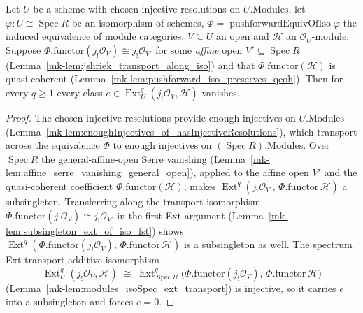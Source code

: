 \begin{lemma}\label{mk-lem:ext_jShriekOU_eq_zero_of_specIso}
  \leanok

  Let \(U\) be a scheme with chosen injective resolutions on \(U.\mathrm{Modules}\), let
  \(\varphi : U \cong \operatorname{Spec} R\) be an isomorphism of schemes,
  \(\Phi = \operatorname{pushforwardEquivOfIso}\varphi\) the induced equivalence of module categories,
  \(V \subseteq U\) an open and \(\mathcal{H}\) an \(\mathcal{O}_U\)-module. Suppose
  \(\Phi.\mathrm{functor}(j_!\mathcal{O}_V) \cong j_!\mathcal{O}_{V'}\) for some \emph{affine} open
  \(V' \subseteq \operatorname{Spec} R\) (Lemma~\ref{mk-lem:jshriek_transport_along_iso}) and that
  \(\Phi.\mathrm{functor}(\mathcal{H})\) is quasi-coherent
  (Lemma~\ref{mk-lem:pushforward_iso_preserves_qcoh}). Then for every \(q \geq 1\) every class
  \(e \in \operatorname{Ext}^q_U(j_!\mathcal{O}_V, \mathcal{H})\) vanishes.
\end{lemma}
\begin{proof}
  \leanok
    The chosen injective resolutions provide enough injectives on \(U.\mathrm{Modules}\)
  (Lemma~\ref{mk-lem:enoughInjectives_of_hasInjectiveResolutions}), which transport across the equivalence
  \(\Phi\) to enough injectives on \((\operatorname{Spec} R).\mathrm{Modules}\). Over
  \(\operatorname{Spec} R\) the general-affine-open Serre vanishing
  (Lemma~\ref{mk-lem:affine_serre_vanishing_general_open}), applied to the affine open \(V'\) and the
  quasi-coherent coefficient \(\Phi.\mathrm{functor}(\mathcal{H})\), makes
  \(\operatorname{Ext}^q(j_!\mathcal{O}_{V'},\, \Phi.\mathrm{functor}\,\mathcal{H})\) a subsingleton.
  Transferring along the transport isomorphism
  \(\Phi.\mathrm{functor}(j_!\mathcal{O}_V) \cong j_!\mathcal{O}_{V'}\) in the first Ext-argument
  (Lemma~\ref{mk-lem:subsingleton_ext_of_iso_fst}) shows
  \(\operatorname{Ext}^q(\Phi.\mathrm{functor}(j_!\mathcal{O}_V),\, \Phi.\mathrm{functor}\,\mathcal{H})\)
  is a subsingleton as well. The spectrum Ext-transport additive isomorphism
  \[
    \operatorname{Ext}^q_U(j_!\mathcal{O}_V, \mathcal{H})
      \;\cong\;
    \operatorname{Ext}^q_{\operatorname{Spec} R}\bigl(\Phi.\mathrm{functor}(j_!\mathcal{O}_V),\,
      \Phi.\mathrm{functor}\,\mathcal{H}\bigr)
  \]
  (Lemma~\ref{mk-lem:modules_isoSpec_ext_transport}) is injective, so it carries \(e\) into a subsingleton
  and forces \(e = 0\).
\end{proof}

